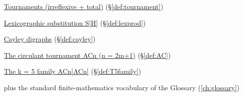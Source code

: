 \begin{closurepanel}
\item \hyperref[def:tournament]{Tournaments (irreflexive + total)} (\S\ref*{def:tournament})
\item \hyperref[def:lexprod]{Lexicographic substitution S[H]} (\S\ref*{def:lexprod})
\item \hyperref[def:cayley]{Cayley digraphs} (\S\ref*{def:cayley})
\item \hyperref[def:AC]{The circulant tournament ACn (n = 2m+1)} (\S\ref*{def:AC})
\item \hyperref[def:T5family]{The k = 5 family ACn[ACn]} (\S\ref*{def:T5family})
\item plus the standard finite-mathematics vocabulary of the Glossary (\cref{ch:glossary})
\end{closurepanel}
